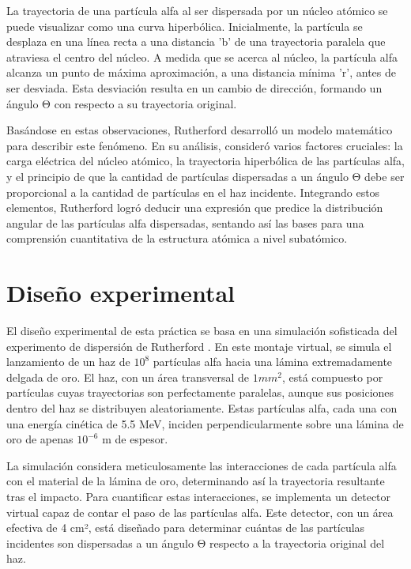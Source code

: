 \documentclass[twocolumn,a4paper,11pt]{scrartcl}
\begin{document}
La trayectoria de una partícula alfa al ser dispersada por un núcleo atómico se puede visualizar como una curva hiperbólica. Inicialmente, la partícula se desplaza en una línea recta a una distancia 'b' de una trayectoria paralela que atraviesa el centro del núcleo. A medida que se acerca al núcleo, la partícula alfa alcanza un punto de máxima aproximación, a una distancia mínima 'r', antes de ser desviada. Esta desviación resulta en un cambio de dirección, formando un ángulo Θ con respecto a su trayectoria original.

Basándose en estas observaciones, Rutherford desarrolló un modelo matemático para describir este fenómeno. En su análisis, consideró varios factores cruciales: la carga eléctrica del núcleo atómico, la trayectoria hiperbólica de las partículas alfa, y el principio de que la cantidad de partículas dispersadas a un ángulo Θ debe ser proporcional a la cantidad de partículas en el haz incidente. Integrando estos elementos, Rutherford logró deducir una expresión que predice la distribución angular de las partículas alfa dispersadas, sentando así las bases para una comprensión cuantitativa de la estructura atómica a nivel subatómico.

\section{Diseño experimental}
El diseño experimental de esta práctica se basa en una simulación sofisticada \cite{Simulador} del experimento de dispersión de Rutherford \cite{Melissinos1968}. En este montaje virtual, se simula el lanzamiento de un haz de $10^8$ partículas alfa hacia una lámina extremadamente delgada de oro. El haz, con un área transversal de $1 mm^2$, está compuesto por partículas cuyas trayectorias son perfectamente paralelas, aunque sus posiciones dentro del haz se distribuyen aleatoriamente. Estas partículas alfa, cada una con una energía cinética de 5.5 MeV, inciden perpendicularmente sobre una lámina de oro de apenas $10^{-6}$ m de espesor.

La simulación considera meticulosamente las interacciones de cada partícula alfa con el material de la lámina de oro, determinando así la trayectoria resultante tras el impacto. Para cuantificar estas interacciones, se implementa un detector virtual capaz de contar el paso de las partículas alfa. Este detector, con un área efectiva de 4 cm², está diseñado para determinar cuántas de las partículas incidentes son dispersadas a un ángulo Θ respecto a la trayectoria original del haz.
\end{document}
